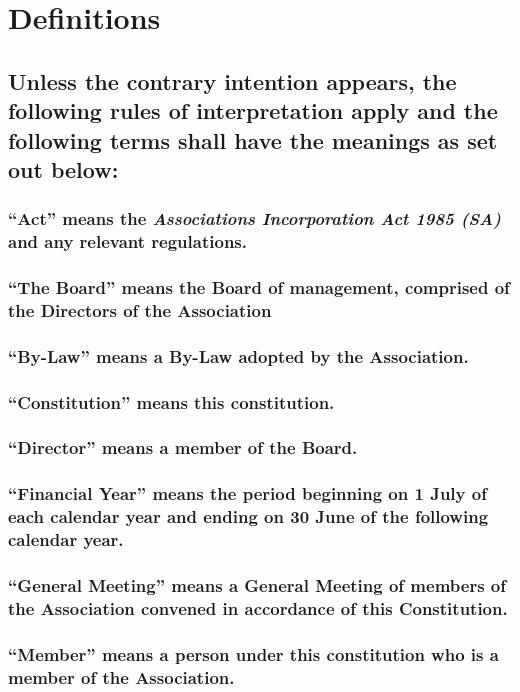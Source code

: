 \documentclass{article}
\newenvironment{subs}
  {\adjustwidth{2em}{0pt}}
  {\endadjustwidth}
\begin{document}
\section{Definitions}
\begin{subs}
\subsection{Unless the contrary intention appears, the following rules of interpretation apply and the following terms shall have the meanings as set out below:}
\begin{subs}
\subsubsection{``Act'' means the \textit{Associations Incorporation Act 1985 (SA)} and any relevant regulations.}
\subsubsection{``The Board'' means the Board of management, comprised of the Directors of the Association}
\subsubsection{``By-Law'' means a By-Law adopted by the Association.}
\newpage

\subsubsection{``Constitution'' means this constitution.}
\subsubsection{``Director'' means a member of the Board.}
\subsubsection{``Financial Year'' means the period beginning on 1 July of each calendar year and ending on 30 June of the following calendar year.}
\subsubsection{``General Meeting'' means a General Meeting of members of the Association convened in accordance of this Constitution.}
\subsubsection{``Member'' means a person under this constitution who is a member of the Association.}

\end{subs}
\end{subs}
\end{document}
